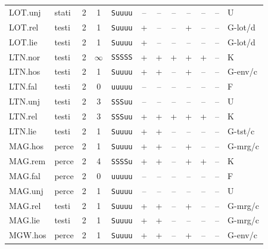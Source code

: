{\begin{longtable}{@{}llcccccccccl@{}}
LOT.unj & stati & 2 & 1 & \texttt{Suuuu} & \textsf{--} & \textsf{--} & \textsf{--} & \textsf{--} & \textsf{--} & -- & U \\
LOT.rel & testi & 2 & 1 & \texttt{Suuuu} & \textsf{+} & \textsf{--} & \textsf{--} & \textsf{+} & \textsf{--} & -- & G-lot/d \\
LOT.lie & testi & 2 & 1 & \texttt{Suuuu} & \textsf{+} & \textsf{--} & \textsf{--} & \textsf{--} & \textsf{--} & -- & G-lot/d \\
LTN.nor & testi & 2 & $\infty$ & \texttt{SSSSS} & \textsf{+} & \textsf{+} & \textsf{+} & \textsf{+} & \textsf{+} & -- & K \\
LTN.hos & testi & 2 & 1 & \texttt{Suuuu} & \textsf{+} & \textsf{+} & \textsf{--} & \textsf{+} & \textsf{--} & -- & G-env/c \\
LTN.fal & testi & 2 & 0 & \texttt{uuuuu} & \textsf{--} & \textsf{--} & \textsf{--} & \textsf{--} & \textsf{--} & -- & F \\
LTN.unj & testi & 2 & 3 & \texttt{SSSuu} & \textsf{--} & \textsf{--} & \textsf{--} & \textsf{--} & \textsf{--} & -- & U \\
LTN.rel & testi & 2 & 3 & \texttt{SSSuu} & \textsf{+} & \textsf{+} & \textsf{+} & \textsf{+} & \textsf{+} & -- & K \\
LTN.lie & testi & 2 & 1 & \texttt{Suuuu} & \textsf{+} & \textsf{+} & \textsf{--} & \textsf{--} & \textsf{--} & -- & G-tst/c \\
MAG.hos & perce & 2 & 1 & \texttt{Suuuu} & \textsf{+} & \textsf{+} & \textsf{--} & \textsf{+} & \textsf{--} & -- & G-mrg/c \\
MAG.rem & perce & 2 & 4 & \texttt{SSSSu} & \textsf{+} & \textsf{+} & \textsf{--} & \textsf{+} & \textsf{+} & -- & K \\
MAG.fal & perce & 2 & 0 & \texttt{uuuuu} & \textsf{--} & \textsf{--} & \textsf{--} & \textsf{--} & \textsf{--} & -- & F \\
MAG.unj & perce & 2 & 1 & \texttt{Suuuu} & \textsf{--} & \textsf{--} & \textsf{--} & \textsf{--} & \textsf{--} & -- & U \\
MAG.rel & testi & 2 & 1 & \texttt{Suuuu} & \textsf{+} & \textsf{+} & \textsf{--} & \textsf{+} & \textsf{--} & -- & G-mrg/c \\
MAG.lie & testi & 2 & 1 & \texttt{Suuuu} & \textsf{+} & \textsf{+} & \textsf{--} & \textsf{--} & \textsf{--} & -- & G-mrg/c \\
MGW.hos & perce & 2 & 1 & \texttt{Suuuu} & \textsf{+} & \textsf{+} & \textsf{--} & \textsf{+} & \textsf{--} & -- & G-env/c \\

\end{longtable}}
